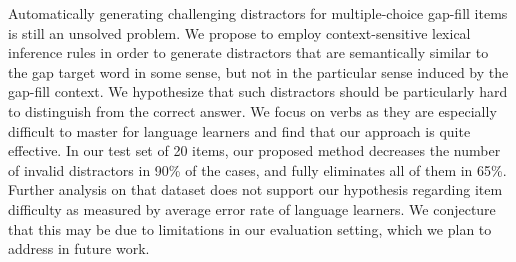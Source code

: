 Automatically generating challenging distractors for multiple-choice gap-fill items is still an unsolved problem. We propose to employ context-sensitive lexical inference rules in order to generate distractors that are semantically similar to the gap target word in some sense, but not in the particular sense induced by the gap-fill context. We hypothesize that such distractors should be particularly hard to distinguish from the correct answer. We focus on verbs as they are especially difficult to master for language learners and find that our approach is quite effective. In our test set of 20 items, our proposed method decreases the number of invalid distractors in 90\% of the cases, and fully eliminates all of them in 65\%. Further analysis on that dataset does not support our hypothesis regarding item difficulty as measured by average error rate of language learners. We conjecture that this may be due to limitations in our evaluation setting, which we plan to address in future work.
